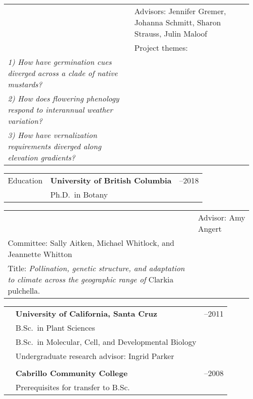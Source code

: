 \documentclass[letterpaper,11pt,oneside]{article}
\begin{document}
\noindent \begin{tabular}{@{} p{3cm} p{12.61cm}}
& Advisors: Jennifer Gremer, Johanna Schmitt, Sharon Strauss, Julin Maloof \\
& \raggedright{Project themes:} \\
\raggedright{\textit{1) How have germination cues diverged across a clade of native mustards?}}  \\
\raggedright{\textit{2) How does flowering phenology respond to interannual weather variation?}}  \\
\raggedright{\textit{3) How have vernalization requirements diverged along elevation gradients?}}  \\
\end{tabular}
\bigskip


  

\noindent \begin{tabular}{@{} p{3cm} p{10.91cm} >{\raggedleft\arraybackslash}p{1.7cm}}
\Large{Education}    & \textbf{University of British Columbia} & 2012--2018 \\
& Ph.D.\ in Botany & \\
\end{tabular}

\noindent \begin{tabular}{@{} p{3cm} p{12.61cm}}
& \raggedright{Advisor: Amy Angert} \\
\raggedright{Committee: Sally Aitken, Michael Whitlock, and Jeannette Whitton} \\
\raggedright{Title: \textit{Pollination, genetic structure, and adaptation to climate across the geographic range of} Clarkia pulchella.} \\
\end{tabular}

\noindent \begin{tabular}{@{} p{3cm} p{10.91cm} >{\raggedleft\arraybackslash}p{1.7cm}}
& \textbf{University of California, Santa Cruz} & 2008--2011 \\
& B.Sc.\ in Plant Sciences & \\
& B.Sc.\ in Molecular, Cell, and Developmental Biology& \\
& Undergraduate research advisor: Ingrid Parker & \\
& & \\
& \textbf{Cabrillo Community College} &  2007--2008 \\
& Prerequisites for transfer to B.Sc. & \\
\end{tabular}
\bigskip
\bigskip
\end{document}
